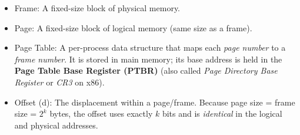 \documentclass[11pt]{article}
\newcommand{\cle}[1]{{\popxbold\color{popdark}#1}}
\begin{document}
\begin{definition}
\begin{itemize}
    \item \cle{Frame}: A fixed-size block of physical memory.
    \item \cle{Page}: A fixed-size block of logical memory (same size as a frame).
    \item \cle{Page Table}: A per-process data structure that maps each \emph{page number} to a \emph{frame number}. It is stored in main memory; its base address is held in the \textbf{Page Table Base Register (PTBR)} (also called \emph{Page Directory Base Register} or \emph{CR3} on x86).
    \item \cle{Offset (d)}: The displacement within a page/frame. Because page size = frame size = $2^k$ bytes, the offset uses exactly $k$ bits and is \emph{identical} in the logical and physical addresses.
\end{itemize}
\end{definition}
\end{document}
